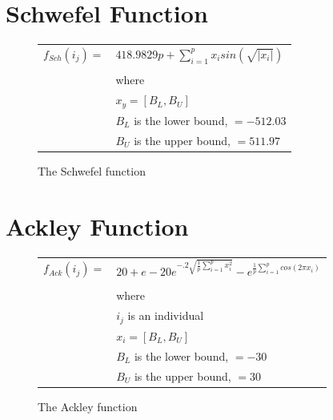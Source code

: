 \documentclass[12pt]{article}
\begin{document}
\section{Schwefel Function}
\begin{figure}[!h]
        \begin{center}
		\begin{tabular}{r l}
			$ f_{Sch}(i_j) = $		&	$  418.9829p + \sum_{i=1}^{p} x_i sin(\sqrt{|{x_i}|}) $\\
								& \\
								&	where \\
								&	$ x_y = [B_L, B_U] $ \\
								& 	$ B_L $ is the lower bound, $ = -512.03 $ \\
								& 	$ B_U $ is the upper bound, $ = 511.97 $\\

		\end{tabular} 
               \caption{The Schwefel function}
                \label{schwefel}
        \end{center}
\end{figure}

\section{Ackley Function}
\begin{figure}[!h]
        \begin{center}
		\begin{tabular}{r l}
			$ f_{Ack}(i_j) = $		&	$ 20 + e - 20 e^{ -.2 \sqrt{ \frac{1}{p} \sum_{i=1}^{p} x_i^2 } } - e^{ \frac{1}{p} \sum_{i=1}^{p} cos(2 \pi x_i) }  $\\
								& \\
								&	where \\
								&	$ i_j $ is an individual \\
								&	$ x_i = [B_L, B_U] $ \\
								& 	$ B_L $ is the lower bound, $ = -30 $ \\
								& 	$ B_U $ is the upper bound, $ = 30 $\\

		\end{tabular} 
               \caption{The Ackley function}
                \label{ackley}
        \end{center}
\end{figure}

\pagebreak
\end{document}
